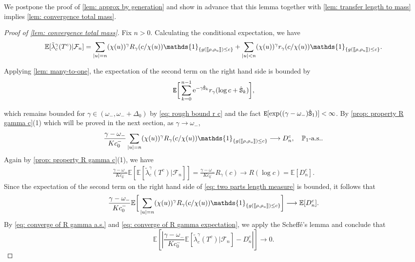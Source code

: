 \documentclass[12pt]{article}
\def\llbracket{[\hspace{-.10em} [ }
\def\rrbracket{ ] \hspace{-.10em}]}
\numberwithin{equation}{section}
\theoremstyle{plain}
\theoremstyle{definition}
\begin{document}
We postpone the proof of \cref{lem: approx by generation} and show in advance that this lemma together with \cref{lem: transfer length to mass} implies \cref{lem: convergence total mass}.

\begin{proof}[Proof of \cref{lem: convergence total mass}]
Fix $n>0$. Calculating the conditional expectation, we have
\begin{equation}\label{eq: two parts length measure}
        \mathbb{E}[\tilde{\lambda}^{\gamma}_{c}(T^c)|\mathcal{F}_n]= \sum_{|u| = n}(\chi(u))^{\gamma}R_{\gamma}(c/\chi(u)) \mathds{1}_{\{g(\llbracket \rho, \rho_u \rrbracket) \leq c\}}
+ \sum_{|u| < n} (\chi(u))^{\gamma}r_{\gamma}(c/\chi(u)) \mathds{1}_{\{g(\llbracket \rho, \rho_u \rrbracket) \leq c\}}.
\end{equation}

\noindent Applying \cref{lem: many-to-one}, the expectation of the second term on the right hand side is bounded by
\[{\tt E}\bigg[\sum^{n-1}_{k=0} \mathrm{e}^{-\gamma{\hat{\tt S}}_k} r_{\gamma}(\log c + {\hat{\tt S}}_k) \bigg],\]

\noindent which remains bounded for $\gamma\in (\omega_-, \omega_- + \Delta_0)$ by \eqref{eq: rough bound r c} and the fact ${\tt E}[\exp((\gamma-\omega_-){\hat{\tt S}}_1)]< \infty$. By \cref{prop: property R gamma c}(1) which will be proved in the next section, as $\gamma\to \omega_-$,
\begin{equation}\label{eq: converge of R gamma a.s.}
    \frac{\gamma-\omega_-}{Kc_0^-} \sum_{|u| = n}(\chi(u))^{\gamma}R_{\gamma}(c/\chi(u)) \mathds{1}_{\{g(\llbracket \rho, \rho_u \rrbracket) \leq c\}} \longrightarrow D^c_n, \quad \mathbb{P}_1\mbox{-a.s.}.
\end{equation}
\noindent Again by \cref{prop: property R gamma c}(1), we have
\begin{align*}
    \frac{\gamma-\omega_-}{Kc_0^-}\mathbb{E}\left[\mathbb{E}[\tilde{\lambda}^{\gamma}_{c}(T^c)|\mathcal{F}_n]\right]=\frac{\gamma-\omega_-}{Kc_0^-} R_\gamma(c)\longrightarrow R(\log c)=\mathbb E[D^c_n].
\end{align*}
Since the expectation of the second term on the right hand side of \eqref{eq: two parts length measure} is bounded, it follows that
\begin{align}\label{eq: converge of R gamma expectation}
     \frac{\gamma-\omega_-}{Kc_0^-}\mathbb{E}\bigg[\sum_{|u| = n}(\chi(u))^{\gamma}R_{\gamma}(c/\chi(u)) \mathds{1}_{\{g(\llbracket \rho, \rho_u \rrbracket) \leq c\}}\bigg]\longrightarrow \mathbb E[D^c_n].
\end{align}
By \eqref{eq: converge of R gamma a.s.} and \eqref{eq: converge of R gamma expectation}, we apply the Scheff\'e’s lemma and conclude that
\begin{equation}\label{eq: length convergence L^1}
    \mathbb E\left[\left|\frac{\gamma-\omega_-}{Kc_0^-}\mathbb{E}[\tilde{\lambda}^{\gamma}_{c}(T^c)|\mathcal{F}_n]-D_n^c\right|\right]\to 0.
\end{equation}


\end{proof}
\end{document}
